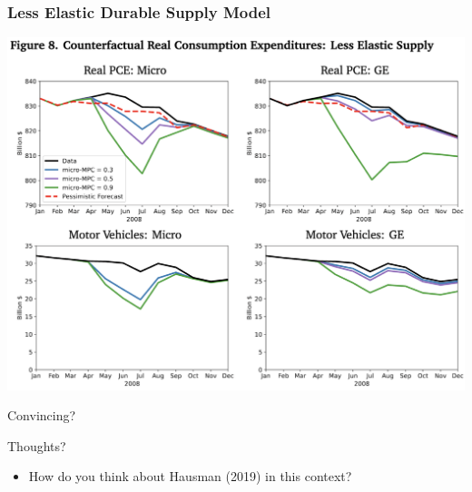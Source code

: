 \documentclass[english,xcolor=svgnames]{beamer}
\begin{document}
\begin{frame}[label=durablepriceforecasts]
\frametitle{Less Elastic Durable Supply Model}

\begin{center}
	\includegraphics[scale=0.4]{figures/ORWFIG8.png}
 \end{center} 
\end{frame}

\begin{frame}{Convincing?}
	
\end{frame}

\begin{frame}{Thoughts?}
	\begin{itemize}
		\item How do you think about Hausman (2019) in this context?
	\end{itemize}
\end{frame}
\end{document}
